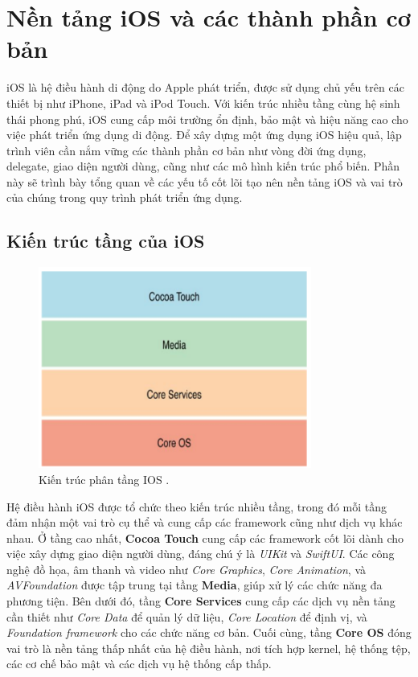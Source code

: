 
\section{Nền tảng iOS và các thành phần cơ bản}
iOS là hệ điều hành di động do Apple phát triển, được sử dụng chủ yếu trên các thiết bị như iPhone, iPad và iPod Touch. Với kiến trúc nhiều tầng cùng hệ sinh thái phong phú, iOS cung cấp môi trường ổn định, bảo mật và hiệu năng cao cho việc phát triển ứng dụng di động. Để xây dựng một ứng dụng iOS hiệu quả, lập trình viên cần nắm vững các thành phần cơ bản như vòng đời ứng dụng, delegate, giao diện người dùng, cũng như các mô hình kiến trúc phổ biến. Phần này sẽ trình bày tổng quan về các yếu tố cốt lõi tạo nên nền tảng iOS và vai trò của chúng trong quy trình phát triển ứng dụng.
    \subsection{Kiến trúc tầng của iOS}
        
            \begin{figure}[H] %
                \centering
                \includegraphics[width=0.8\textwidth]{images/kientrucios.png}
                \caption{Kiến trúc phân tầng IOS \cite{kientrucios}.}
                \label{fig:kientrucios}
            \end{figure}

            Hệ điều hành iOS được tổ chức theo kiến trúc nhiều tầng, trong đó mỗi tầng đảm nhận một vai trò cụ thể và cung cấp các framework cũng như dịch vụ khác nhau. Ở tầng cao nhất, \textbf{Cocoa Touch} cung cấp các framework cốt lõi dành cho việc xây dựng giao diện người dùng, đáng chú ý là \textit{UIKit} và \textit{SwiftUI}. Các công nghệ đồ họa, âm thanh và video như \textit{Core Graphics}, \textit{Core Animation}, và \textit{AVFoundation} được tập trung tại tầng \textbf{Media}, giúp xử lý các chức năng đa phương tiện. Bên dưới đó, tầng \textbf{Core Services} cung cấp các dịch vụ nền tảng cần thiết như \textit{Core Data} để quản lý dữ liệu, \textit{Core Location} để định vị, và \textit{Foundation framework} cho các chức năng cơ bản. Cuối cùng, tầng \textbf{Core OS} đóng vai trò là nền tảng thấp nhất của hệ điều hành, nơi tích hợp kernel, hệ thống tệp, các cơ chế bảo mật và các dịch vụ hệ thống cấp thấp.

